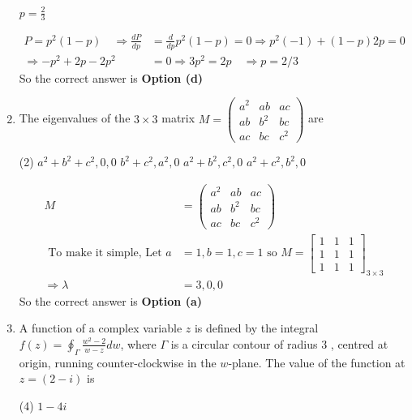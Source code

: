 \begin{enumerate}
\begin{tasks}
	\task[\textbf{d.}] $p=\frac{2}{3}$ 
\end{tasks}
\begin{answer}
	\begin{align*}
	P=p^{2}(1-p) \quad \Rightarrow \frac{d P}{d p}&=\frac{d}{d p} p^{2}(1-p)=0 \Rightarrow p^{2}(-1)+(1-p) 2 p=0\\
	\Rightarrow-p^{2}+2 p-2 p^{2}&=0 \Rightarrow 3 p^{2}=2 p \quad \Rightarrow p=2 / 3
	\end{align*}
	So the correct answer is \textbf{Option (d)}
\end{answer}
\item The eigenvalues of the $3 \times 3$ matrix $M=\left(\begin{array}{lll}a^{2} & a b & a c \\ a b & b^{2} & b c \\ a c & b c & c^{2}\end{array}\right)$ are
 \begin{tasks}(2)
	\task[\textbf{a.}]$a^{2}+b^{2}+c^{2}, 0,0$
	\task[\textbf{b.}]$b^{2}+c^{2}, a^{2}, 0$
	\task[\textbf{c.}]$a^{2}+b^{2}, c^{2}, 0$
	\task[\textbf{d.}]$a^{2}+c^{2}, b^{2}, 0$	 
\end{tasks}
\begin{answer}
	\begin{align*}
	M&=\left(\begin{array}{lll}
	a^{2} & a b & a c \\
	a b & b^{2} & b c \\
	a c & b c & c^{2}
	\end{array}\right)\\
\text{	To make it simple, Let }a&=1, b=1, c=1\text{ so }
	M=\left[\begin{array}{lll}
	1 & 1 & 1 \\
	1 & 1 & 1 \\
	1 & 1 & 1
	\end{array}\right]_{3 \times 3}\\
	\Rightarrow \lambda&=3,0,0
	\end{align*}
		So the correct answer is \textbf{Option (a)}
\end{answer}
\item  A function of a complex variable $z$ is defined by the integral $f(z)=\oint_{\Gamma} \frac{w^{2}-2}{w-z} d w$, where $\Gamma$ is a circular contour of radius 3 , centred at origin, running counter-clockwise in the $w$-plane. The value of the function at $z=(2-i)$ is
 \begin{tasks}(4)
	\task[\textbf{b.}]$1-4 i$

\end{tasks}
\end{enumerate}
